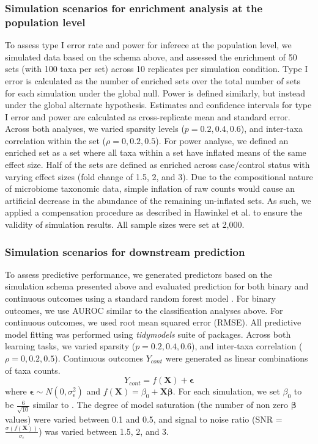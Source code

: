 \documentclass{article}
\begin{document}
\subsubsection{Simulation scenarios for enrichment analysis at the population level}
To assess type I error rate and power for inferece at the population level, we simulated data based on the schema above, and assessed the enrichment of 50 sets (with 100 taxa per set) across 10 replicates per simulation condition. Type I error is calculated as the number of enriched sets over the total number of sets for each simulation under the global null. Power is defined similarly, but instead under the global alternate hypothesis. Estimates and confidence intervals for type I error and power are calculated as cross-replicate mean and standard error. Across both analyses, we varied sparsity levels ($p = 0.2, 0.4, 0.6$), and inter-taxa correlation within the set ($\rho = 0, 0.2, 0.5$). For power analyse, we defined an enriched set as a set where all taxa within a set have inflated means of the same effect size.  Half of the sets are defined as enriched across case/control status with varying effect sizes (fold change of 1.5, 2, and 3). Due to the compositional nature of microbiome taxonomic data, simple inflation of raw counts would cause an artificial decrease in the abundance of the remaining un-inflated sets. As such, we applied a compensation procedure as described in Hawinkel et al. \cite{hawinkel2019} to ensure the validity of simulation results. All sample sizes were set at 2,000.    

\subsubsection{Simulation scenarios for downstream prediction}
To assess predictive performance, we generated predictors based on the simulation schema presented above and evaluated prediction for both binary and continuous outcomes using a standard random forest model \cite{breiman2001}. For binary outcomes, we use AUROC similar to the classification analyses above. For continuous outcomes, we used root mean squared error (RMSE). All predictive model fitting was performed using \emph{tidymodels} \cite{kuhn2020} suite of packages. Across both learning tasks, we varied sparsity ($p = 0.2, 0.4, 0.6$), and inter-taxa correlation ($\rho = 0, 0.2, 0.5$). Continuous outcomes $Y_{cont}$ were generated as linear combinations of taxa counts.  
\begin{equation}
    Y_{cont} = f(\mathbf{X}) + \mathbf{\epsilon}
\end{equation}
where $\mathbf{\epsilon} \sim N(0, \sigma_{\epsilon}^2)$ and $f(\mathbf{X}) = \beta_0 + \mathbf{X}\mathbf{\beta}$. For each simulation, we set $\beta_0$ to be $\frac{6}{\sqrt{10}}$ similar to \cite{xiao2018}. The degree of model saturation (the number of non zero $\mathbf{\beta}$ values) were varied between 0.1 and 0.5, and signal to noise ratio (SNR = $\frac{\sigma(f(\mathbf{X}))}{\sigma_{\epsilon}}$) was varied between 1.5, 2, and 3. 
\end{document}
